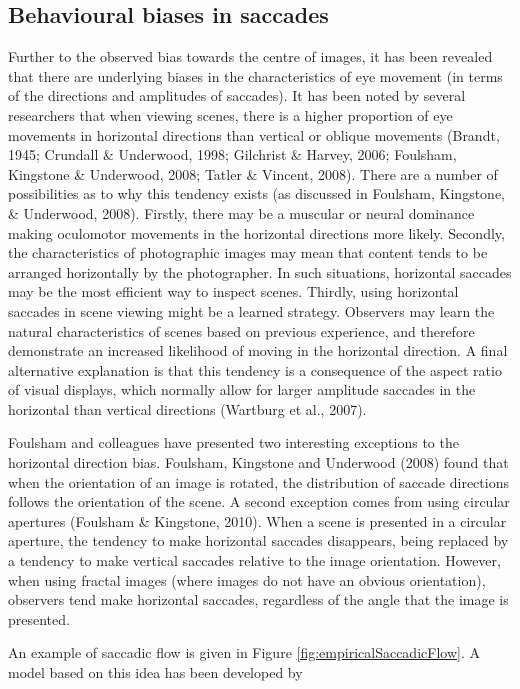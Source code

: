 \documentclass[a4paper, twocolumn, oneside, 11pt]{article}
\begin{document}
\subsection{Behavioural biases in saccades}
Further to the observed bias towards the centre of images, it has been revealed that there are underlying biases in the characteristics of eye movement (in terms of the directions and amplitudes of saccades). It has been noted by several researchers that when viewing scenes, there is a higher proportion of eye movements in horizontal directions than vertical or oblique movements (Brandt, 1945; Crundall \& Underwood, 1998; Gilchrist \& Harvey, 2006; Foulsham, Kingstone \& Underwood, 2008; Tatler \& Vincent, 2008). There are a number of possibilities as to why this tendency exists (as discussed in Foulsham, Kingstone, \& Underwood, 2008). Firstly, there may be a muscular or neural dominance making oculomotor movements in the horizontal directions more likely. Secondly, the characteristics of photographic images may mean that content tends to be arranged horizontally by the photographer. In such situations, horizontal saccades may be the most efficient way to inspect scenes. Thirdly, using horizontal saccades in scene viewing might be a learned strategy. Observers may learn the natural characteristics of scenes based on previous experience, and therefore demonstrate an increased likelihood of moving in the horizontal direction. A final alternative explanation is that this tendency is a consequence of the aspect ratio of visual displays, which normally allow for larger amplitude saccades in the horizontal than vertical directions (Wartburg et al., 2007).

Foulsham and colleagues have presented two interesting exceptions to the horizontal direction bias. Foulsham, Kingstone and Underwood (2008) found that when the orientation of an image is rotated, the distribution of saccade directions follows the orientation of the scene. A second exception comes from using circular apertures (Foulsham \& Kingstone, 2010). When a scene is presented in a circular aperture, the tendency to make horizontal saccades disappears, being replaced by a tendency to make vertical saccades relative to the image orientation. However, when using fractal images (where images do not have an obvious orientation), observers tend make horizontal saccades, regardless of the angle that the image is presented.

An example of saccadic flow is given in Figure \ref{fig:empiricalSaccadicFlow}. A model based on this idea has been developed by \cite{clarke2015}
\end{document}
